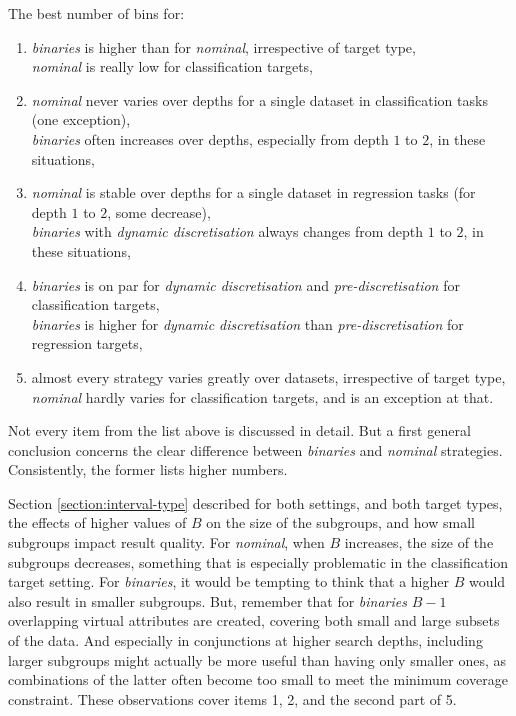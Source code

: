 \documentclass[smallextended]{svjour3}
\newcommand{\parameter}{\emph}
\newcommand{\dyndis}{\parameter{dynamic discretisation}}
\newcommand{\predis}{\parameter{pre-discretisation}}
\newcommand{\binaries}{\parameter{binaries}}
\newcommand{\nominal}{\parameter{nominal}}
\newcommand{\all}{\parameter{all}}
\newcommand{\best}{\parameter{best}}
\begin{document}
The best number of bins for:
\begin{enumerate}
\item \binaries{} is higher than for \nominal{}, irrespective of target type,\\
      \nominal{} is really low for classification targets,
\item \nominal{} never varies over depths for a single dataset in classification tasks (one exception),\\
      \binaries{} often increases over depths, especially from depth $1$ to $2$, in these situations,
\item \nominal{} is stable over depths for a single dataset in regression tasks (for depth $1$ to $2$, some decrease),\\
      \binaries{} with \dyndis{} always changes from depth $1$ to $2$, in these situations,
\item \binaries{} is on par for \dyndis{} and \predis{} for classification targets,\\
      \binaries{} is higher for \dyndis{} than \predis{} for regression targets,
\item almost every strategy varies greatly over datasets, irrespective of target type,\\
      \nominal{} hardly varies for classification targets, and is an exception at that.
\end{enumerate}

Not every item from the list above is discussed in detail.
But a first general conclusion concerns the clear difference between \binaries{} and \nominal{} strategies.
Consistently, the former lists higher numbers.

Section \ref{section:interval-type} described for both settings, and both target types, the effects of higher values of $B$ on the size of the subgroups, and how small subgroups impact result quality.
For \nominal{}, when $B$ increases, the size of the subgroups decreases, something that is especially problematic in the classification target setting.
For \binaries{}, it would be tempting to think that a higher $B$ would also result in smaller subgroups.
But, remember that for \binaries{} $B{-}1$ overlapping virtual attributes are created, covering both small and large subsets of the data.
And especially in conjunctions at higher search depths, including larger subgroups might actually be more useful than having only smaller ones, as combinations of the latter often become too small to meet the minimum coverage constraint.
These observations cover items 1, 2, and the second part of 5.
\end{document}
